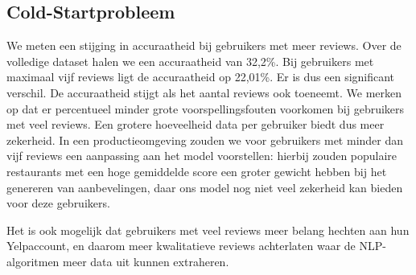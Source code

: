 

\subsection{Cold-Startprobleem}
We meten een stijging in accuraatheid bij gebruikers met meer reviews. Over de volledige dataset halen we een accuraatheid van 32,2\%. Bij gebruikers met maximaal vijf reviews ligt de accuraatheid op 22,01\%. Er is dus een significant verschil. De accuraatheid stijgt als het aantal reviews ook toeneemt. We merken op dat er percentueel minder grote voorspellingsfouten voorkomen bij gebruikers met veel reviews. Een grotere hoeveelheid data per gebruiker biedt dus meer zekerheid. In een productieomgeving zouden we voor gebruikers met minder dan vijf reviews een aanpassing aan het model voorstellen: hierbij zouden populaire restaurants met een hoge gemiddelde score een groter gewicht hebben bij het genereren van aanbevelingen, daar ons model nog niet veel zekerheid kan bieden voor deze gebruikers.

Het is ook mogelijk dat gebruikers met veel reviews meer belang hechten aan hun Yelpaccount, en daarom meer kwalitatieve reviews achterlaten waar de NLP-algoritmen meer data uit kunnen extraheren.




